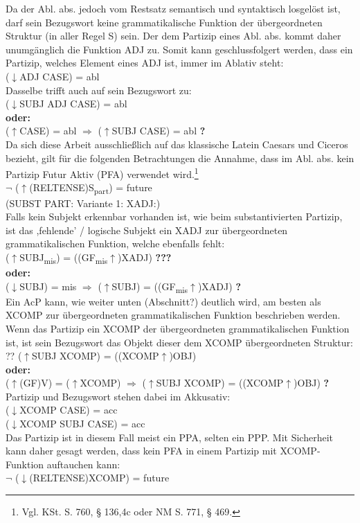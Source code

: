 \documentclass[12pt,a4paper]{article}
\begin{document}
Da der Abl. abs. jedoch vom Restsatz semantisch und syntaktisch losgelöst ist, darf sein Bezugswort keine grammatikalische Funktion der übergeordneten Struktur (in aller Regel S) sein. Der dem Partizip eines Abl. abs. kommt daher unumgänglich die Funktion ADJ zu. Somit kann geschlussfolgert werden, dass ein Partizip, welches Element eines ADJ ist, immer im Ablativ steht: \\
($\downarrow$ADJ CASE) = abl \\
Dasselbe trifft auch auf sein Bezugswort zu: \\
($\downarrow$SUBJ ADJ CASE) = abl \\
\textbf{oder:} \\
($\uparrow$CASE) = abl $\Rightarrow$ ($\uparrow$SUBJ CASE) = abl \textbf{?}\\
Da sich diese Arbeit ausschließlich auf das klassische Latein Caesars und Ciceros bezieht, gilt für die folgenden Betrachtungen die Annahme, dass im Abl. abs. kein Partizip Futur Aktiv (PFA) verwendet wird.\footnote{Vgl. KSt. S. 760, § 136,4c oder NM S. 771, § 469.}\\
$\neg$ ($\uparrow$(RELTENSE)S\textsubscript{part}) = future \\

(SUBST PART: Variante 1: XADJ:) \\
Falls kein Subjekt erkennbar vorhanden ist, wie beim substantivierten Partizip, ist das ,fehlende' / logische Subjekt ein XADJ zur übergeordneten grammatikalischen Funktion, welche ebenfalls fehlt: \\
($\uparrow$SUBJ\textsubscript{mis}) = ((GF\textsubscript{mis}$\uparrow$)XADJ) \textbf{???} \\
\textbf{oder:} \\
($\downarrow$SUBJ) = mis $\Rightarrow$ ($\uparrow$SUBJ) = ((GF\textsubscript{mis}$\uparrow$)XADJ) \textbf{?}\\

Ein AcP kann, wie weiter unten (Abschnitt?) deutlich wird, am besten als XCOMP zur übergeordneten grammatikalischen Funktion beschrieben werden.
Wenn das Partizip ein XCOMP der übergeordneten grammatikalischen Funktion ist, ist sein Bezugswort das Objekt dieser dem XCOMP übergeordneten Struktur: \\ ??
($\uparrow$SUBJ XCOMP) = ((XCOMP$\uparrow$)OBJ) \\
\textbf{oder:} \\
($\uparrow$(GF)V) = ($\uparrow$XCOMP) $\Rightarrow$ ($\uparrow$SUBJ XCOMP) = ((XCOMP$\uparrow$)OBJ) \textbf{?} \\
Partizip und Bezugswort stehen dabei im Akkusativ: \\
($\downarrow$XCOMP CASE) = acc \\
($\downarrow$XCOMP SUBJ CASE) = acc \\
Das Partizip ist in diesem Fall meist ein PPA, selten ein PPP. Mit Sicherheit kann daher gesagt werden, dass kein PFA in einem Partizip mit XCOMP-Funktion auftauchen kann: \\
$\neg$ ($\downarrow$(RELTENSE)XCOMP) = future \\
\end{document}
